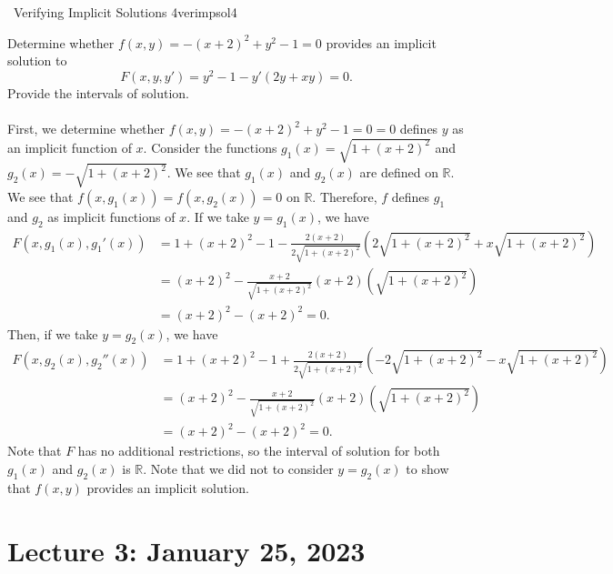         \begin{example}{\Difficulty\,\Difficulty\,\,Verifying Implicit Solutions 4}{verimpsol4}
                    
            Determine whether \(f(x,y)=-(x+2)^2+y^2-1=0\) provides an implicit solution to
            \begin{equation*}
                F(x,y,y')=y^2-1-y'(2y+xy)=0.
            \end{equation*}
            Provide the intervals of solution.
            \\
            \\
            First, we determine whether \(f(x,y)=-(x+2)^2+y^2-1=0=0\) defines \(y\) as an implicit function of \(x\). Consider the functions \(g_1(x)=\sqrt{1+(x+2)^2}\) and \(g_2(x)=-\sqrt{1+(x+2)^2}\). We see that \(g_1(x)\) and \(g_2(x)\) are defined on \(\mathbb{R}\). We see that \(f(x,g_1(x))=f(x,g_2(x))=0\) on \(\mathbb{R}\). Therefore, \(f\) defines \(g_1\) and \(g_2\) as implicit functions of \(x\). If we take \(y=g_1(x)\), we have
            \begin{align*}
               F(x,g_1(x),g_1'(x))&=1+(x+2)^2-1-\frac{2(x+2)}{2\sqrt{1+(x+2)^2}}(2\sqrt{1+(x+2)^2}+x\sqrt{1+(x+2)^2}) \\
               &=(x+2)^2-\frac{x+2}{\sqrt{1+(x+2)^2}}(x+2)(\sqrt{1+(x+2)^2}) \\
               &=(x+2)^2-(x+2)^2=0.
            \end{align*}
            Then, if we take \(y=g_2(x)\), we have
            \begin{align*}
                F(x,g_2(x),g_2''(x))&=1+(x+2)^2-1+\frac{2(x+2)}{2\sqrt{1+(x+2)^2}}(-2\sqrt{1+(x+2)^2}-x\sqrt{1+(x+2)^2}) \\
                &=(x+2)^2-\frac{x+2}{\sqrt{1+(x+2)^2}}(x+2)(\sqrt{1+(x+2)^2}) \\
                &=(x+2)^2-(x+2)^2=0.
             \end{align*}
            Note that \(F\) has no additional restrictions, so the interval of solution for both \(g_1(x)\) and \(g_2(x)\) is \(\mathbb{R}\). Note that we did not to consider \(y=g_2(x)\) to show that \(f(x,y)\) provides an implicit solution.
            
        \end{example}

\pagebreak

\section{Lecture 3: January 25, 2023}

